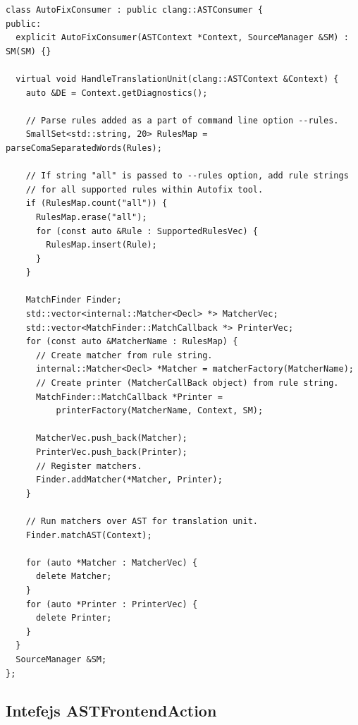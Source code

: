 \documentclass[12pt,oneside]{memoir}
\begin{document}
\begin{lstlisting}[style=customc,  caption={Implementacija klase \texttt{AutoFixConsumer} u okviru alata \textit{AutoFix}.}, label=lst:labelConsumer]
class AutoFixConsumer : public clang::ASTConsumer {
public:
  explicit AutoFixConsumer(ASTContext *Context, SourceManager &SM) : SM(SM) {}

  virtual void HandleTranslationUnit(clang::ASTContext &Context) {
    auto &DE = Context.getDiagnostics();

    // Parse rules added as a part of command line option --rules.
    SmallSet<std::string, 20> RulesMap = parseComaSeparatedWords(Rules);

    // If string "all" is passed to --rules option, add rule strings
    // for all supported rules within Autofix tool.
    if (RulesMap.count("all")) {
      RulesMap.erase("all");
      for (const auto &Rule : SupportedRulesVec) {
        RulesMap.insert(Rule);
      }
    }

    MatchFinder Finder;
    std::vector<internal::Matcher<Decl> *> MatcherVec;
    std::vector<MatchFinder::MatchCallback *> PrinterVec;
    for (const auto &MatcherName : RulesMap) {
      // Create matcher from rule string.
      internal::Matcher<Decl> *Matcher = matcherFactory(MatcherName);
      // Create printer (MatcherCallBack object) from rule string.
      MatchFinder::MatchCallback *Printer =
          printerFactory(MatcherName, Context, SM);

      MatcherVec.push_back(Matcher);
      PrinterVec.push_back(Printer);
      // Register matchers.
      Finder.addMatcher(*Matcher, Printer);
    }

    // Run matchers over AST for translation unit.
    Finder.matchAST(Context);

    for (auto *Matcher : MatcherVec) {
      delete Matcher;
    }
    for (auto *Printer : PrinterVec) {
      delete Printer;
    }
  }
  SourceManager &SM;
};
\end{lstlisting}

\subsection{Intefejs ASTFrontendAction}
\end{document}
